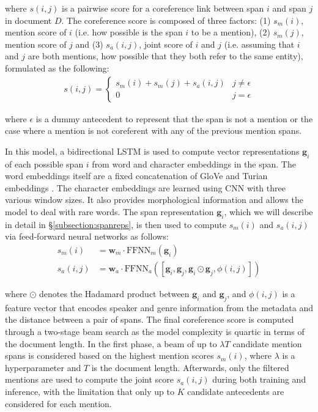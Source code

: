 \documentclass[11pt]{article}
\begin{document}
where $s(i,j)$ is a pairwise score for a coreference link between span $i$ and span $j$ in document $D$. The coreference score is composed of three factors: (1) $s_{m}(i)$, mention score of $i$ (i.e. how possible is the span $i$ to be a mention), (2) $s_{m}(j)$, mention score of $j$ and (3) $s_{a}(i,j)$, joint score of $i$ and $j$ (i.e. assuming that $i$ and $j$ are both mentions, how possible that they both refer to the same entity), formulated as the following:
\begin{align}
s(i, j) = \begin{cases}
s_{m}(i) + s_{m}(j) + s_{a}(i, j) & j \neq \epsilon \\
0 & j = \epsilon
\end{cases}
\end{align} 

where $\epsilon$ is a dummy antecedent to represent that the span is not a mention or the case where a mention is not coreferent with any of the previous mention spans.

In this model, a bidirectional LSTM \parencite{lstm} is used to compute vector representations $\pmb{g}_{i}$ of each possible span $i$ from word and character embeddings in the span. The word embeddings itself are a fixed concatenation of GloVe \parencite{pennington2014glove} and Turian embeddings \parencite{turian-etal-2010-word}. The character embeddings are learned using CNN with three various window sizes. It also provides morphological information and allows the model to deal with rare words. The span representation $\pmb{g}_{i}$, which we will describe in detail in \S\ref{subsection:spanreps}, is then used to compute $s_{m}(i)$ and $s_{a}(i, j)$ via feed-forward neural networks as follows:
\begin{align}
s_{m}(i) &= \pmb{w}_{m} \cdot \text{FFNN}_{m}(\pmb{g}_{i}) \\
s_{a}(i, j) &= \pmb{w}_{a} \cdot \text{FFNN}_{a}([\pmb{g}_{i}, \pmb{g}_{j}, \pmb{g}_{i} \odot \pmb{g}_{j}, \phi(i, j)])
\end{align}

where $\odot$ denotes the Hadamard product between $\pmb{g}_{i}$ and $\pmb{g}_{j}$, and $\phi(i, j)$ is a feature vector that encodes speaker and genre information from the metadata and the distance between a pair of spans. The final coreference score is computed through a two-stage beam search as the model complexity is quartic in terms of the document length. In the first phase, a beam of up to $\lambda T$ candidate mention spans is considered based on the highest mention scores $s_{m}(i)$, where $\lambda$ is a hyperparameter and $T$ is the document length. Afterwards, only the filtered mentions are used to compute the joint score $s_{a}(i, j)$ during both training and inference, with the limitation that only up to $K$ candidate antecedents are considered for each mention.
\end{document}

